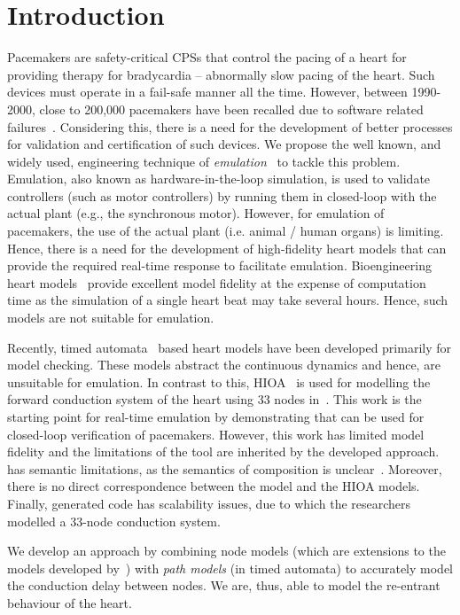 \section{Introduction}

Pacemakers are safety-critical \acp{CPS} that control the pacing of a
heart for providing therapy for bradycardia -- abnormally slow pacing of
the heart.  Such devices must operate in a fail-safe manner all the
time. However, between 1990-2000, close to 200,000 pacemakers have been
recalled due to software related
failures~\cite{alemzadeh13}. Considering this, there is a need for the
development of better processes for validation and certification of such
devices. We propose the well known, and widely used, engineering
technique of \emph{emulation}~\cite{patel2015survey} to tackle this
problem. Emulation, also known as hardware-in-the-loop simulation, is
used to validate controllers (such as motor controllers) by running them
in closed-loop with the actual plant (e.g., the synchronous motor).
However, for emulation of pacemakers, the use of the actual plant
(i.e. animal / human organs) is limiting.  Hence, there is a need for
the development of high-fidelity heart models that can provide the
required real-time response to facilitate emulation. Bioengineering
heart models~\cite{Trayanova2014} provide excellent model fidelity at
the expense of computation time as the simulation of a single heart beat
may take several hours. Hence, such models are not suitable for
emulation.

Recently, timed automata~\cite{zhihao12} based heart models have been
developed primarily for model checking. These models abstract the
continuous dynamics and hence, are unsuitable for emulation.  In
contrast to this, \acf{HIOA}~\cite{alur2015principles, raskin05} is used
for modelling the forward conduction system of the heart using 33 nodes
in~\cite{chen14}. This work is the starting point for real-time
emulation by demonstrating that \simulink can be used for closed-loop
verification of pacemakers. However, this work has limited model
fidelity and the limitations of the tool \simulink are inherited by the
developed approach.  \simulink has semantic limitations, as the
semantics of composition is unclear~\cite{need-some-ref}.  Moreover,
there is no direct correspondence between the \simulink model and the
\ac{HIOA} models. Finally, \simulink generated code has scalability
issues, due to which the researchers modelled a 33-node conduction
system.

We develop an approach by combining node models (which are extensions to
the models developed by~\cite{chen14}) with \emph{path models} (in timed
automata) to accurately model the conduction delay between nodes. We
are, thus, able to model the re-entrant behaviour of the heart.

